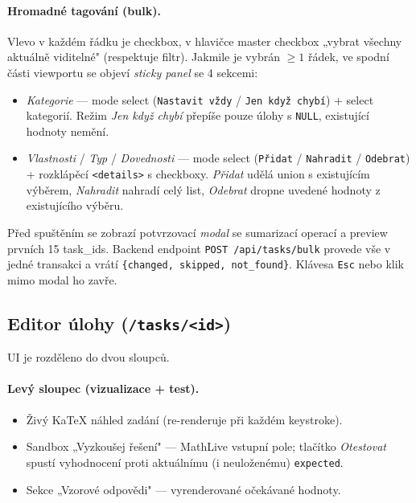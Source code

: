 \documentclass[11pt,a4paper]{article}
\begin{document}
\paragraph{Hromadné tagování (bulk).} Vlevo v každém řádku je checkbox, v hlavičce master checkbox „vybrat všechny aktuálně viditelné" (respektuje filtr). Jakmile je vybrán $\geq 1$ řádek, ve spodní části viewportu se objeví \emph{sticky panel} se 4 sekcemi:

\begin{itemize}
  \item \emph{Kategorie} --- mode select (\texttt{Nastavit vždy} / \texttt{Jen když chybí}) + select kategorií. Režim \emph{Jen když chybí} přepíše pouze úlohy s \texttt{NULL}, existující hodnoty nemění.
  \item \emph{Vlastnosti} / \emph{Typ} / \emph{Dovednosti} --- mode select (\texttt{Přidat} / \texttt{Nahradit} / \texttt{Odebrat}) + rozklápěcí \texttt{<details>} s checkboxy. \emph{Přidat} udělá union s existujícím výběrem, \emph{Nahradit} nahradí celý list, \emph{Odebrat} dropne uvedené hodnoty z existujícího výběru.
\end{itemize}

Před spuštěním se zobrazí potvrzovací \emph{modal} se sumarizací operací a preview prvních 15 task\_ids. Backend endpoint \texttt{POST /api/tasks/bulk} provede vše v jedné transakci a vrátí \texttt{\{changed, skipped, not\_found\}}. Klávesa \texttt{Esc} nebo klik mimo modal ho zavře.

\subsection{Editor úlohy (\texttt{/tasks/<id>})}

UI je rozděleno do dvou sloupců.

\paragraph{Levý sloupec (vizualizace + test).}
\begin{itemize}
  \item Živý KaTeX náhled zadání (re-renderuje při každém keystroke).
  \item Sandbox „Vyzkoušej řešení" --- MathLive vstupní pole; tlačítko \emph{Otestovat} spustí vyhodnocení proti aktuálnímu (i neuloženému) \texttt{expected}.
  \item Sekce „Vzorové odpovědi" --- vyrenderované očekávané hodnoty.
\end{itemize}
\end{document}

